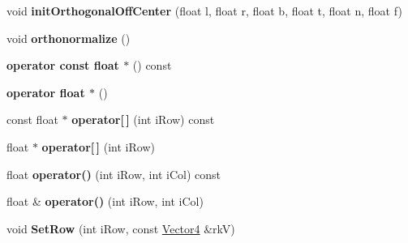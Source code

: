 \begin{DoxyCompactItemize}
\item 
void {\bfseries init\+Orthogonal\+Off\+Center} (float l, float r, float b, float t, float n, float f)\hypertarget{class_i_dream_sky_1_1_matrix4_aa7389bb46ea86c4c009b51c77e66279c}{}\label{class_i_dream_sky_1_1_matrix4_aa7389bb46ea86c4c009b51c77e66279c}

\item 
void {\bfseries orthonormalize} ()\hypertarget{class_i_dream_sky_1_1_matrix4_a9dff1a4cbaab68ab4d0ccaf5c8bf313e}{}\label{class_i_dream_sky_1_1_matrix4_a9dff1a4cbaab68ab4d0ccaf5c8bf313e}

\item 
{\bfseries operator const float $\ast$} () const \hypertarget{class_i_dream_sky_1_1_matrix4_ab21fc1e54677109e5b25e530fdac2b83}{}\label{class_i_dream_sky_1_1_matrix4_ab21fc1e54677109e5b25e530fdac2b83}

\item 
{\bfseries operator float $\ast$} ()\hypertarget{class_i_dream_sky_1_1_matrix4_a0ffdcf73a5b8cc15fcc7960c28e902d6}{}\label{class_i_dream_sky_1_1_matrix4_a0ffdcf73a5b8cc15fcc7960c28e902d6}

\item 
const float $\ast$ {\bfseries operator\mbox{[}$\,$\mbox{]}} (int i\+Row) const \hypertarget{class_i_dream_sky_1_1_matrix4_a756467229e7e5d0eee609b6538c6b877}{}\label{class_i_dream_sky_1_1_matrix4_a756467229e7e5d0eee609b6538c6b877}

\item 
float $\ast$ {\bfseries operator\mbox{[}$\,$\mbox{]}} (int i\+Row)\hypertarget{class_i_dream_sky_1_1_matrix4_ad9ad690248b8ec51c13b5ace9ffca01a}{}\label{class_i_dream_sky_1_1_matrix4_ad9ad690248b8ec51c13b5ace9ffca01a}

\item 
float {\bfseries operator()} (int i\+Row, int i\+Col) const \hypertarget{class_i_dream_sky_1_1_matrix4_a0be592c4a25fc2386433275d4f4aa37d}{}\label{class_i_dream_sky_1_1_matrix4_a0be592c4a25fc2386433275d4f4aa37d}

\item 
float \& {\bfseries operator()} (int i\+Row, int i\+Col)\hypertarget{class_i_dream_sky_1_1_matrix4_a9ab67fec57241894809c7c36b2afbc68}{}\label{class_i_dream_sky_1_1_matrix4_a9ab67fec57241894809c7c36b2afbc68}

\item 
void {\bfseries Set\+Row} (int i\+Row, const \hyperlink{class_i_dream_sky_1_1_vector4}{Vector4} \&rkV)\hypertarget{class_i_dream_sky_1_1_matrix4_a4a28820472af64fa1dcdb3f22be5707e}{}\label{class_i_dream_sky_1_1_matrix4_a4a28820472af64fa1dcdb3f22be5707e}


\end{DoxyCompactItemize}
